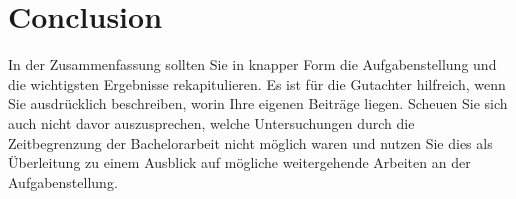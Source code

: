 \documentclass[a4paper,11pt,twosided,final,german,openbib,pdftex,listof=totoc,bibliography=totoc]{scrbook}
\begin{document}
\chapter{Conclusion}

In der Zusammenfassung sollten Sie in knapper Form die Aufgabenstellung 
und die wichtigsten Ergebnisse rekapitulieren. Es ist f\"ur die 
Gutachter hilfreich, wenn Sie ausdr\"ucklich beschreiben, worin 
Ihre eigenen Beitr\"age liegen. Scheuen Sie sich auch nicht davor 
auszusprechen, welche Untersuchungen durch die Zeitbegrenzung der 
Bachelorarbeit nicht m\"oglich waren und nutzen Sie dies als 
\"Uberleitung zu einem Ausblick auf m\"ogliche weitergehende 
Arbeiten an der Aufgabenstellung.

\end{document}
